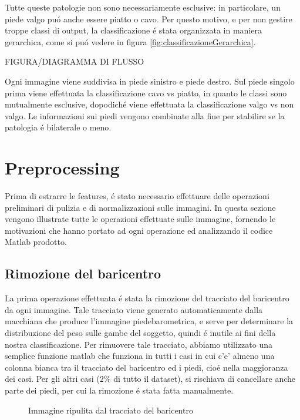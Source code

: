 \documentclass[11pt,twoside,a4paper]{article}
\begin{document}
Tutte queste patologie non sono necessariamente esclusive: in particolare, un piede valgo pu\'o anche essere piatto o cavo. Per questo motivo, e per non gestire troppe classi di output, la classificazione \'e stata organizzata in maniera gerarchica, come si pu\'o vedere in figura \ref{fig:classificazioneGerarchica}.

FIGURA/DIAGRAMMA DI FLUSSO

Ogni immagine viene suddivisa in piede sinistro e piede destro. Sul piede singolo prima viene effettuata la classificazione cavo vs piatto, in quanto le classi sono mutualmente esclusive, dopodich\'e viene effettuata la classificazione valgo vs non valgo. Le informazioni sui piedi vengono combinate alla fine per stabilire se la patologia \'e bilaterale o meno.

\section{Preprocessing}
\label{sec:preprocessing}
Prima di estrarre le features, \'e stato necessario effettuare delle operazioni preliminari di pulizia e di normalizzazioni sulle immagini. In questa sezione vengono illustrate tutte le operazioni effettuate sulle immagine, fornendo le motivazioni che hanno portato ad ogni operazione ed analizzando il codice Matlab prodotto.

\subsection{Rimozione del baricentro}
La prima operazione effettuata \'e stata la rimozione del tracciato del baricentro da ogni immagine. Tale tracciato viene generato automaticamente dalla macchiana che produce l'immagine piedebarometrica, e serve per determinare la distribuzione del peso sulle gambe del soggetto, quindi \'e inutile ai fini della nostra classificazione. Per rimuovere tale tracciato, abbiamo utilizzato una semplice funzione matlab che funziona in tutti i casi in cui c'e' almeno una colonna bianca tra il tracciato del baricentro ed i piedi, cio\'e nella maggioranza dei casi. Per gli altri casi ($2\%$ di tutto il dataset), si rischiava di cancellare anche parte dei piedi, per cui la rimozione \'e stata fatta manualmente.

\begin{figure}
\centering
\caption{Immagine ripulita dal tracciato del baricentro}
\end{figure}
\end{document}
